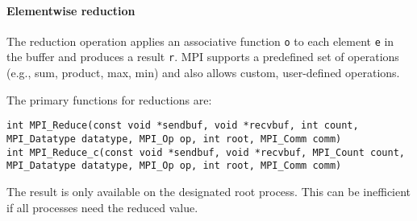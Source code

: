 \paragraph*{Elementwise reduction}
The reduction operation applies an associative function \texttt{o} to each element \texttt{e} in the buffer and produces a result \texttt{r}.
 MPI supports a predefined set of operations (e.g., sum, product, max, min) and also allows custom, user-defined operations.

The primary functions for reductions are:
\begin{lstlisting}[style=C]
int MPI_Reduce(const void *sendbuf, void *recvbuf, int count, MPI_Datatype datatype, MPI_Op op, int root, MPI_Comm comm)
int MPI_Reduce_c(const void *sendbuf, void *recvbuf, MPI_Count count, MPI_Datatype datatype, MPI_Op op, int root, MPI_Comm comm)
\end{lstlisting}
The result is only available on the designated root process. 
This can be inefficient if all processes need the reduced value.